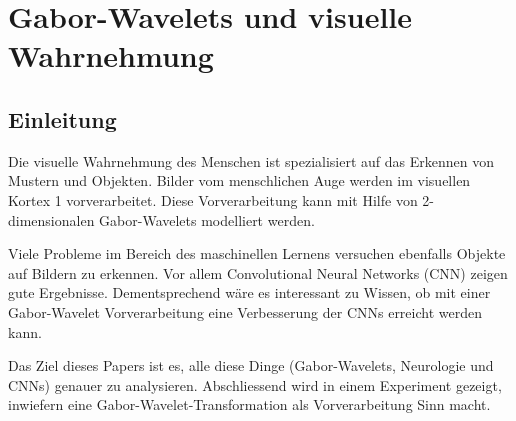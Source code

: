 %
%
%
\chapter{Gabor-Wavelets und visuelle Wahrnehmung\label{chapter:visuell}}
\begin{refsection}

\section{Einleitung}

Die visuelle Wahrnehmung des Menschen ist spezialisiert auf das Erkennen von Mustern und Objekten.
Bilder vom menschlichen Auge werden im visuellen Kortex 1 vorverarbeitet.
Diese Vorverarbeitung kann mit Hilfe von 2-dimensionalen Gabor-Wavelets modelliert werden.

Viele Probleme im Bereich des maschinellen Lernens versuchen ebenfalls Objekte auf Bildern zu erkennen.
Vor allem Convolutional Neural Networks (CNN) zeigen gute Ergebnisse.
Dementsprechend wäre es interessant zu Wissen, ob mit einer Gabor-Wavelet Vorverarbeitung eine Verbesserung der CNNs erreicht werden kann.

Das Ziel dieses Papers ist es, alle diese Dinge (Gabor-Wavelets, Neurologie und CNNs) genauer zu analysieren.
Abschliessend wird in einem Experiment gezeigt, inwiefern eine Gabor-Wavelet-Transformation als Vorverarbeitung Sinn macht.









\printbibliography[heading=subbibliography]
\end{refsection}
